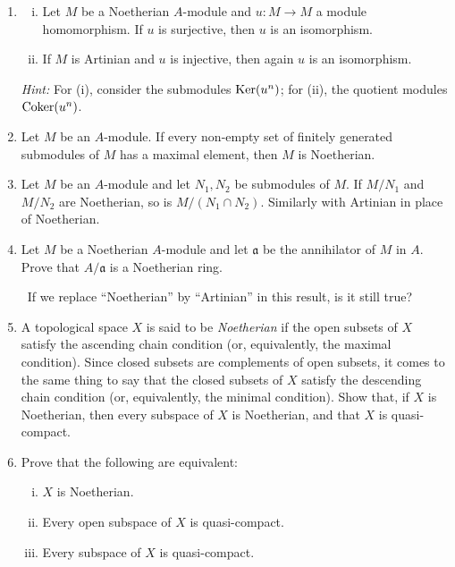 
\begin{enumerate}
    \item \label{exer1-chapter6}\begin{enumerate}[i)]
        \item Let $M$ be a Noetherian $A$-module and $u \colon M \to M$ a module homomorphism. If $u$ is surjective, then $u$ is an isomorphism.
        \item If $M$ is Artinian and $u$ is injective, then again $u$ is an isomorphism.
    \end{enumerate}
    \textit{Hint:} For (i), consider the submodules $\operatorname{Ker}(u^n)$; for (ii), the quotient modules $\operatorname{Coker}(u^n)$.

    \item \label{exer2-chapter6}Let $M$ be an $A$-module. If every non-empty set of finitely generated submodules of $M$ has a maximal element, then $M$ is Noetherian.

    \item \label{exer3-chapter6}Let $M$ be an $A$-module and let $N_1, N_2$ be submodules of $M$. If $M/N_1$ and $M/N_2$ are Noetherian, so is $M/(N_1 \cap N_2)$. Similarly with Artinian in place of Noetherian.

    \item \label{exer4-chapter6}Let $M$ be a Noetherian $A$-module and let $\mathfrak{a}$ be the annihilator of $M$ in $A$. Prove that $A/\mathfrak{a}$ is a Noetherian ring.
    
    \quad\, If we replace ``Noetherian'' by ``Artinian'' in this result, is it still true?

    \item \label{exer5-chapter6}A topological space $X$ is said to be \emph{Noetherian} if the open subsets of $X$ satisfy the ascending chain condition (or, equivalently, the maximal condition). Since closed subsets are complements of open subsets, it comes to the same thing to say that the closed subsets of $X$ satisfy the descending chain condition (or, equivalently, the minimal condition). Show that, if $X$ is Noetherian, then every subspace of $X$ is Noetherian, and that $X$ is quasi-compact.

    \item \label{exer6-chapter6}Prove that the following are equivalent:
    \begin{enumerate}[i)]
        \item $X$ is Noetherian.
        \item Every open subspace of $X$ is quasi-compact.
        \item Every subspace of $X$ is quasi-compact.
    \end{enumerate}


\end{enumerate}
